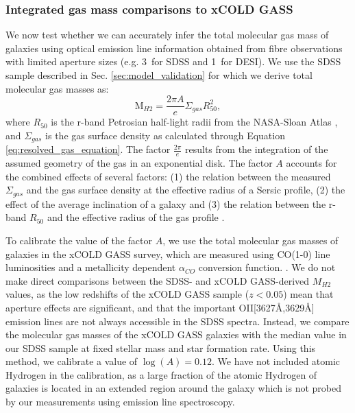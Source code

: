 \documentclass[fleqn,usenatbib]{mnras}
\begin{document}
\subsubsection{Integrated gas mass comparisons to xCOLD GASS}
\label{sec:comparison_xcoldgass}
We now test whether we can accurately infer the total molecular gas mass of galaxies using optical emission line information obtained from fibre observations with limited aperture sizes (e.g. 3\arcsec\ for SDSS and 1\arcsec\ for DESI). We use the SDSS sample described in Sec. \ref{sec:model_validation} for which we derive total molecular gas masses as:
\begin{equation}
    \textrm{M}_{H2} = \frac{2\pi A}{e} \Sigma_{gas} R_{50}^{2}, 
\end{equation}
where $R_{50}$ is the r-band Petrosian half-light radii from the NASA-Sloan Atlas \citep{blanton2011}, and $\Sigma_{gas}$ is the gas surface density as calculated through Equation \ref{eq:resolved_gas_equation}. The factor $\frac{2\pi}{e}$ results from the integration of the assumed geometry of the gas in an exponential disk. The factor $A$ accounts for the combined effects of several factors: (1) the relation between the measured $\Sigma_{gas}$ and the gas surface density at the effective radius of a Sersic profile, (2) the effect of the average inclination of a galaxy and (3) the relation between the r-band $R_{50}$ and the effective radius of the gas profile \citep{casasola2017}. 

To calibrate the value of the factor $A$, we use the total molecular gas masses of galaxies in the xCOLD GASS survey, which are measured using CO(1-0) line luminosities and a metallicity dependent $\alpha_{CO}$ conversion function. \citep{saintonge2017}. We do not make direct comparisons between the SDSS- and xCOLD GASS-derived $M_{H2}$ values, as the low redshifts of the xCOLD GASS sample ($z<0.05$) mean that aperture effects are significant, and that the important OII[3627\AA,3629\AA] emission lines are not always accessible in the SDSS spectra. Instead, we compare the molecular gas masses of the xCOLD GASS galaxies with the median value in our SDSS sample at fixed stellar mass and star formation rate. Using this method, we calibrate a value of $\log(A) = 0.12$. We have not included atomic Hydrogen in the calibration, as a large fraction of the atomic Hydrogen of galaxies is located in an extended region around the galaxy which is not probed by our measurements using emission line spectroscopy.
\end{document}
